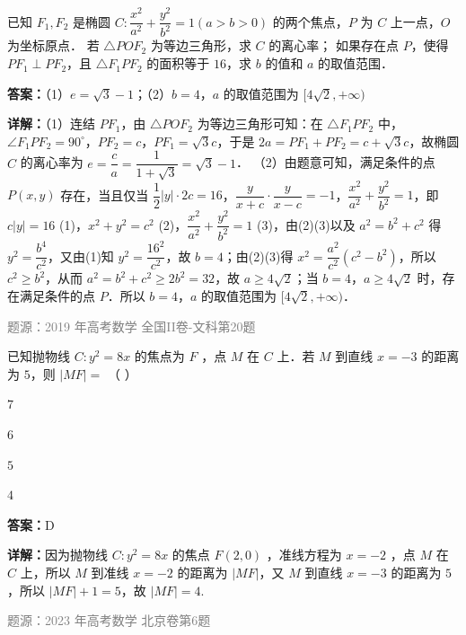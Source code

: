 \begin{question}
已知 $F_1,F_2$ 是椭圆 $C:\dfrac{x^2}{a^2}+\dfrac{y^2}{b^2}=1(a>b>0)$ 的两个焦点，$P$ 为 $C$ 上一点，$O$ 为坐标原点．
若 $\triangle POF_2$ 为等边三角形，求 $C$ 的离心率；
如果存在点 $P$，使得 $PF_1\perp PF_2$，且 $\triangle F_1PF_2$ 的面积等于 $16$，求 $b$ 的值和 $a$ 的取值范围．
\begin{solution}
\textbf{答案：}（1）$e=\sqrt{3}-1$；（2）$b=4$，$a$ 的取值范围为 $[4\sqrt{2},+\infty)$

\textbf{详解：}（1）连结 $PF_1$，由 $\triangle POF_2$ 为等边三角形可知：在 $\triangle F_1PF_2$ 中，$\angle F_1PF_2=90^\circ$，$PF_2=c$，$PF_1=\sqrt{3}c$，于是 $2a=PF_1+PF_2=c+\sqrt{3}c$，故椭圆 $C$ 的离心率为 $e=\dfrac{c}{a}=\dfrac{1}{1+\sqrt{3}}=\sqrt{3}-1$．
（2）由题意可知，满足条件的点 $P(x,y)$ 存在，当且仅当 $\dfrac{1}{2}|y|\cdot2c=16$，$\dfrac{y}{x+c}\cdot\dfrac{y}{x-c}=-1$，$\dfrac{x^2}{a^2}+\dfrac{y^2}{b^2}=1$，即 $c|y|=16$ (1)，$x^2+y^2=c^2$ (2)，$\dfrac{x^2}{a^2}+\dfrac{y^2}{b^2}=1$ (3)，由(2)(3)以及 $a^2=b^2+c^2$ 得 $y^2=\dfrac{b^4}{c^2}$，又由(1)知 $y^2=\dfrac{16^2}{c^2}$，故 $b=4$；由(2)(3)得 $x^2=\dfrac{a^2}{c^2}(c^2-b^2)$，所以 $c^2\ge b^2$，从而 $a^2=b^2+c^2\ge 2b^2=32$，故 $a\ge 4\sqrt{2}$；当 $b=4$，$a\ge 4\sqrt{2}$ 时，存在满足条件的点 $P$．所以 $b=4$，$a$ 的取值范围为 $[4\sqrt{2},+\infty)$．

\textcolor{gray}{\footnotesize 题源：2019 年高考数学 全国II卷-文科第20题}
\end{solution}
\end{question}


\begin{question}
已知抛物线 $C: y^2 = 8x$ 的焦点为 $F$ ，点 $M$ 在 $C$ 上．若 $M$ 到直线 $x = -3$ 的距离为 $5$，则 $|MF| =$ （ ）
\begin{choices}
\item $7$
\item $6$
\item $5$
\item $4$
\end{choices}
\begin{solution}
\textbf{答案：}D

\textbf{详解：}因为抛物线 $C: y^2 = 8x$ 的焦点 $F(2,0)$ ，准线方程为 $x = -2$ ，点 $M$ 在 $C$ 上，所以 $M$ 到准线 $x = -2$ 的距离为 $|MF|$，又 $M$ 到直线 $x = -3$ 的距离为 $5$，所以 $|MF| + 1 = 5$，故 $|MF| = 4$.

\textcolor{gray}{\footnotesize 题源：2023 年高考数学 北京卷第6题}
\end{solution}
\end{question}

